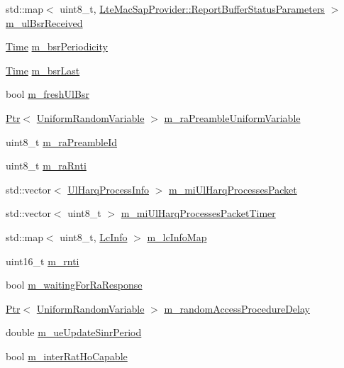 \begin{DoxyCompactItemize}
\item 
std\+::map$<$ uint8\+\_\+t, \hyperlink{structns3_1_1LteMacSapProvider_1_1ReportBufferStatusParameters}{Lte\+Mac\+Sap\+Provider\+::\+Report\+Buffer\+Status\+Parameters} $>$ \hyperlink{classns3_1_1MmWaveUeMac_a4fedb11c547b798c1546f082e147ba03}{m\+\_\+ul\+Bsr\+Received}
\item 
\hyperlink{classns3_1_1Time}{Time} \hyperlink{classns3_1_1MmWaveUeMac_a10a3a9a0ff4ce68865d6e9e8527be86b}{m\+\_\+bsr\+Periodicity}
\item 
\hyperlink{classns3_1_1Time}{Time} \hyperlink{classns3_1_1MmWaveUeMac_a668b3e59ea747acfc474030abd38c93a}{m\+\_\+bsr\+Last}
\item 
bool \hyperlink{classns3_1_1MmWaveUeMac_a79635011889d0b8dff64f05a2a691218}{m\+\_\+fresh\+Ul\+Bsr}
\item 
\hyperlink{classns3_1_1Ptr}{Ptr}$<$ \hyperlink{classns3_1_1UniformRandomVariable}{Uniform\+Random\+Variable} $>$ \hyperlink{classns3_1_1MmWaveUeMac_acc398a8e5f1e24338debcde3f5a8fb37}{m\+\_\+ra\+Preamble\+Uniform\+Variable}
\item 
uint8\+\_\+t \hyperlink{classns3_1_1MmWaveUeMac_a0b48ec5205352aee44ececbeb2c49134}{m\+\_\+ra\+Preamble\+Id}
\item 
uint8\+\_\+t \hyperlink{classns3_1_1MmWaveUeMac_a6cea362cfb06a1739d8a5ba8b590163d}{m\+\_\+ra\+Rnti}
\item 
std\+::vector$<$ \hyperlink{structns3_1_1MmWaveUeMac_1_1UlHarqProcessInfo}{Ul\+Harq\+Process\+Info} $>$ \hyperlink{classns3_1_1MmWaveUeMac_a53afd2059b620c2f3dd1d9791c4df83c}{m\+\_\+mi\+Ul\+Harq\+Processes\+Packet}
\item 
std\+::vector$<$ uint8\+\_\+t $>$ \hyperlink{classns3_1_1MmWaveUeMac_af9a65e100f7b9a8e336a40107bfe3844}{m\+\_\+mi\+Ul\+Harq\+Processes\+Packet\+Timer}
\item 
std\+::map$<$ uint8\+\_\+t, \hyperlink{structns3_1_1MmWaveUeMac_1_1LcInfo}{Lc\+Info} $>$ \hyperlink{classns3_1_1MmWaveUeMac_a0797806054f43d23d0635440bcef7350}{m\+\_\+lc\+Info\+Map}
\item 
uint16\+\_\+t \hyperlink{classns3_1_1MmWaveUeMac_a73d6bc08e75e3a20c5fbaf3113cf40f5}{m\+\_\+rnti}
\item 
bool \hyperlink{classns3_1_1MmWaveUeMac_ab1cbf9aed2d6c3a74370f5f4fbd68910}{m\+\_\+waiting\+For\+Ra\+Response}
\item 
\hyperlink{classns3_1_1Ptr}{Ptr}$<$ \hyperlink{classns3_1_1UniformRandomVariable}{Uniform\+Random\+Variable} $>$ \hyperlink{classns3_1_1MmWaveUeMac_a6745a58972cbd101023806bf92b46051}{m\+\_\+random\+Access\+Procedure\+Delay}
\item 
double \hyperlink{classns3_1_1MmWaveUeMac_a27f7d41957a5939c1926583a3af89b95}{m\+\_\+ue\+Update\+Sinr\+Period}
\item 
bool \hyperlink{classns3_1_1MmWaveUeMac_af93fff68b52c041a2d193b18c9c4f5b0}{m\+\_\+inter\+Rat\+Ho\+Capable}
\end{DoxyCompactItemize}
